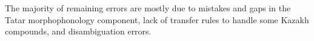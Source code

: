 \documentclass[a4paper,11pt]{article}
\newenvironment{itemise}[1]{
        \begin{itemize}\setlength{\itemsep}{-0.3em}
        \vspace{-0.6em}
        #1
}{
        \end{itemize}
        \vspace{-1pt}
}
\begin{document}






The majority of remaining errors are mostly due to mistakes and gaps in the Tatar morphophonology component, lack of transfer rules to handle some Kazakh compounds, and disambiguation errors.
\end{document}

